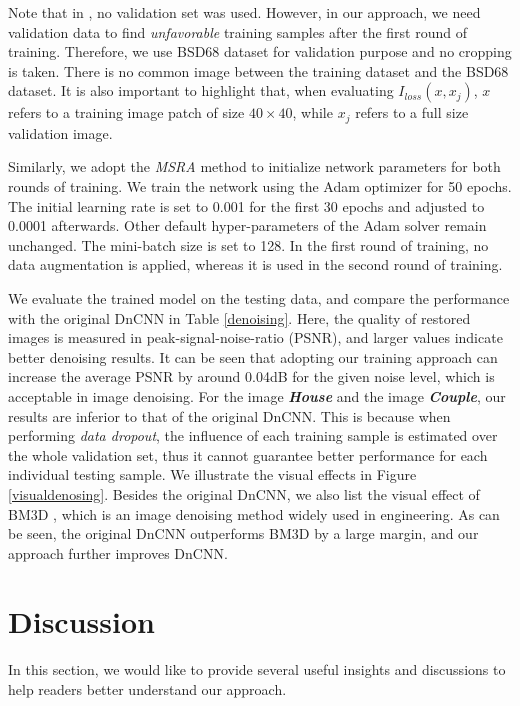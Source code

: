 \documentclass[10pt, conference, letterpaper]{IEEEtran}
\begin{document}
Note that in \cite{zhang2017beyond}, no validation set was used. However, in our approach, we need validation data to find \emph{unfavorable} training samples after the first round of training. Therefore, we use BSD68 dataset \cite{roth2009fields} for validation purpose and no cropping is taken. There is no common image between the training dataset and the BSD68 dataset. It is also important to highlight that, when evaluating $I_{loss}(x, x_{j})$, $x$ refers to a training image patch of size $40\times40$, while $x_{j}$ refers to a full size validation image.


Similarly, we adopt the \emph{MSRA} method \cite{he2015delving} to initialize network parameters for both rounds of training. We train the network using the Adam \cite{kingma2014adam} optimizer for 50 epochs. The initial learning rate is set to 0.001 for the first 30 epochs and adjusted to 0.0001 afterwards. Other default hyper-parameters of the Adam solver remain unchanged. The mini-batch size is set to 128. In the first round of training, no data augmentation is applied, whereas it is used in the second round of training.

We evaluate the trained model on the testing data, and compare the performance with the original DnCNN in Table \ref{denoising}. Here, the quality of restored images is measured in peak-signal-noise-ratio (PSNR), and larger values indicate better denoising results. It can be seen that adopting our training approach can increase the average PSNR by around 0.04dB for the given noise level, which is acceptable in image denoising. For the image \emph{\textbf{House}} and the image \emph{\textbf{Couple}}, our results are inferior to that of the original DnCNN. This is because when performing \emph{data dropout}, the influence of each training sample is estimated over the whole validation set, thus it cannot guarantee better performance for each individual testing sample. We illustrate the visual effects in Figure \ref{visualdenosing}. Besides the original DnCNN, we also list the visual effect of BM3D \cite{dabov2007image}, which is an image denoising method widely used in engineering.
As can be seen, the original DnCNN outperforms BM3D by a large margin, and our approach further improves DnCNN.


\section{Discussion}
\label{discuss}
In this section, we would like to provide several useful insights and discussions to help readers better understand our approach. 
\end{document}

